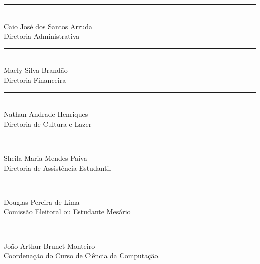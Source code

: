 \documentclass[10pt,letterpaper]{article}
\begin{document}
\begin{multicols}{2}
  \begin{center}
  \rule[]{3in}{0.1pt} \\
  Caio José dos Santos Arruda\\ Diretoria Administrativa\\
  \end{center}

  \begin{center}
  \rule[]{3in}{0.1pt} \\
  Maely Silva Brandão \\ Diretoria Financeira\\
  \end{center}

  \begin{center}
  \rule[]{3in}{0.1pt} \\
  Nathan Andrade Henriques \\ Diretoria de Cultura e Lazer\\
  \end{center}

  \begin{center}
  \rule[]{3in}{0.1pt} \\
  Sheila Maria Mendes Paiva\\ Diretoria de Assistência Estudantil\\
  \end{center}

\end{multicols}

\begin{center}
  \rule[]{3in}{0.1pt} \\
  Douglas Pereira de Lima\\ Comissão Eleitoral ou Estudante Mesário\\
\end{center}


\begin{center}
\rule[]{3in}{0.1pt} \\
João Arthur Brunet Monteiro\\ Coordenação do Curso de Ciência da Computação.\\
\end{center}
\end{document}
